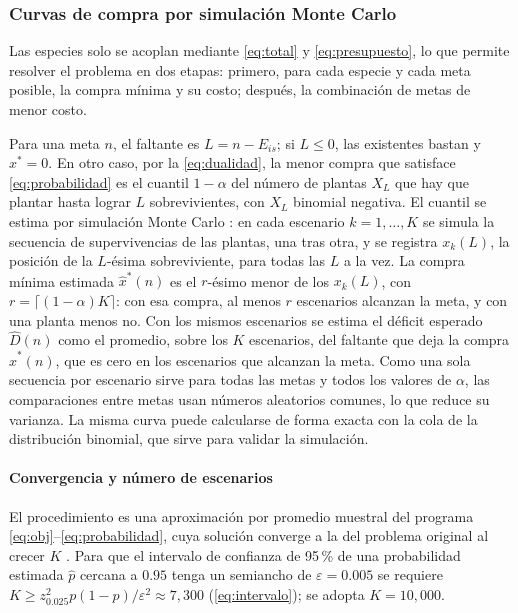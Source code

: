 
\subsubsection{Curvas de compra por simulación Monte Carlo}
\label{subsec:compra-solucion}

Las especies solo se acoplan mediante \eqref{eq:total} y \eqref{eq:presupuesto}, lo que permite resolver el problema en dos etapas: primero, para cada especie y cada meta posible, la compra mínima y su costo; después, la combinación de metas de menor costo.

Para una meta $n$, el faltante es $L=n-E_{is}$; si $L\leq0$, las existentes bastan y $x^{*}=0$. En otro caso, por la \cref{eq:dualidad}, la menor compra que satisface \eqref{eq:probabilidad} es el cuantil $1-\alpha$ del número de plantas $X_L$ que hay que plantar hasta lograr $L$ sobrevivientes, con $X_L$ binomial negativa. El cuantil se estima por simulación Monte Carlo \autocite{:ross2013}: en cada escenario $k=1,\dots,K$ se simula la secuencia de supervivencias de las plantas, una tras otra, y se registra $x_k(L)$, la posición de la $L$-ésima sobreviviente, para todas las $L$ a la vez. La compra mínima estimada $\hat{x}^{*}(n)$ es el $r$-ésimo menor de los $x_k(L)$, con $r=\lceil(1-\alpha)K\rceil$: con esa compra, al menos $r$ escenarios alcanzan la meta, y con una planta menos no. Con los mismos escenarios se estima el déficit esperado $\hat{D}(n)$ como el promedio, sobre los $K$ escenarios, del faltante que deja la compra $\hat{x}^{*}(n)$, que es cero en los escenarios que alcanzan la meta. Como una sola secuencia por escenario sirve para todas las metas y todos los valores de $\alpha$, las comparaciones entre metas usan números aleatorios comunes, lo que reduce su varianza. La misma curva puede calcularse de forma exacta con la cola de la distribución binomial, que sirve para validar la simulación.

\paragraph{Convergencia y número de escenarios} El procedimiento es una aproximación por promedio muestral del programa \eqref{eq:obj}--\eqref{eq:probabilidad}, cuya solución converge a la del problema original al crecer $K$ \autocite{kleywegt2002,luedtke2008}. Para que el intervalo de confianza de 95\,\% de una probabilidad estimada $\hat{p}$ cercana a $0.95$ tenga un semiancho de $\varepsilon=0.005$ se requiere $K\geq z_{0.025}^{2}p(1-p)/\varepsilon^{2}\approx7{,}300$ (\cref{eq:intervalo}); se adopta $K=10{,}000$.

